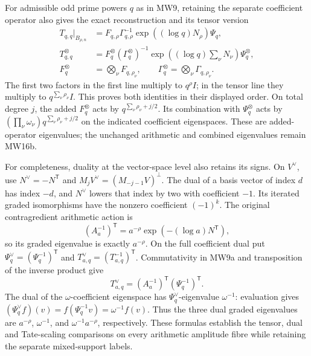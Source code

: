 For admissible odd prime powers \(q\) as in MW9, retaining the
separate coefficient operator also gives the exact reconstruction
and its tensor version
\[
 \begin{aligned}
 T_{q,q}|_{B_{\rho,n}}
   &=F_{q,\rho}\Gamma_{q,\rho}^{-1}
                         \exp((\log q)N_\rho)\Psi_q,\\
 T_{q,q}^{\otimes}
   &=F_q^{\otimes}(\Gamma_q^{\otimes})^{-1}
           \exp\!\left((\log q)\sum_\nu N_\nu\right)
                                      \Psi_q^{\otimes},\\
 F_q^{\otimes}&=\bigotimes_\nu F_{q,\rho_\nu},\qquad
 \Gamma_q^{\otimes}=\bigotimes_\nu\Gamma_{q,\rho_\nu}.
 \end{aligned}
 \tag{MW21a}
\]
The first two factors in the first line multiply to \(q^\rho I\);
in the tensor line they multiply to \(q^{\sum_\nu\rho_\nu}I\).
This proves both identities in their displayed order. On total degree
\(j\), the added \(F_q^{\otimes}\) acts by
\(q^{\sum_\nu\rho_\nu+j/2}\). Its combination with
\(\Psi_q^{\otimes}\) acts by
\((\prod_\nu\omega_\nu)q^{\sum_\nu\rho_\nu+j/2}\) on the indicated
coefficient eigenspaces. These are added-operator eigenvalues; the
unchanged arithmetic and combined eigenvalues remain MW16b.

For completeness, duality at the vector-space level also retains
its signs. On \(V^\vee\), use \(N^\vee=-N^{\mathsf T}\) and
\(M_jV^\vee=(M_{-j-1}V)^\perp\). The dual of a basis vector of
index \(d\) has index \(-d\), and \(N^\vee\) lowers that index
by two with coefficient \(-1\). Its iterated graded isomorphisms
have the nonzero coefficient \((-1)^k\).
The original contragredient arithmetic action is
\[
 (A_a^{-1})^{\mathsf T}
       =a^{-\rho}\exp(-(\log a)N^{\mathsf T}),
 \tag{MW22}
\]
so its graded eigenvalue is exactly \(a^{-\rho}\).
On the full coefficient dual put
\(\Psi_q^\vee=(\Psi_q^{-1})^{\mathsf T}\) and
\(T_{a,q}^\vee=(T_{a,q}^{-1})^{\mathsf T}\). Commutativity in MW9a
and transposition of the inverse product give
\[
 T_{a,q}^\vee=(A_a^{-1})^{\mathsf T}
                         (\Psi_q^{-1})^{\mathsf T}.
 \tag{MW22a}
\]
The dual of the \(\omega\)-coefficient eigenspace has
\(\Psi_q^\vee\)-eigenvalue \(\omega^{-1}\): evaluation gives
\((\Psi_q^\vee f)(v)=f(\Psi_q^{-1}v)=\omega^{-1}f(v)\).
Thus the three dual graded eigenvalues are \(a^{-\rho}\),
\(\omega^{-1}\), and \(\omega^{-1}a^{-\rho}\), respectively.
These formulas establish the tensor, dual and Tate-scaling
comparisons on every arithmetic amplitude fibre while retaining
the separate mixed-support labels.

